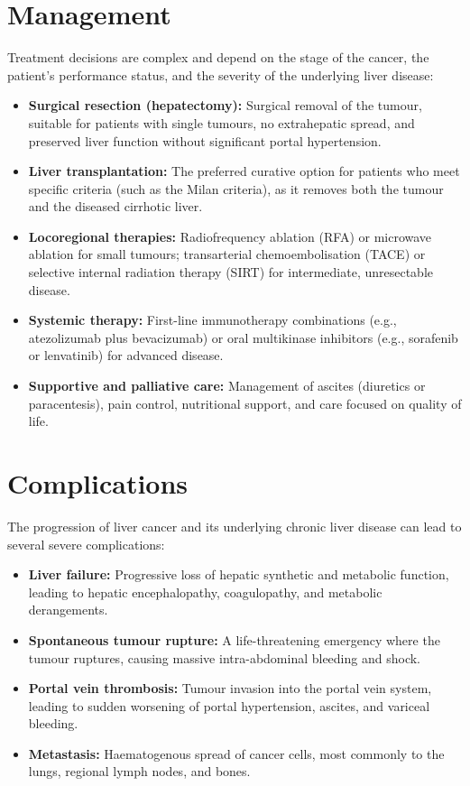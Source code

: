 \section*{Management}
Treatment decisions are complex and depend on the stage of the cancer, the patient's performance status, and the severity of the underlying liver disease:
\begin{itemize}
    \item \textbf{Surgical resection (hepatectomy):} Surgical removal of the tumour, suitable for patients with single tumours, no extrahepatic spread, and preserved liver function without significant portal hypertension.
    \item \textbf{Liver transplantation:} The preferred curative option for patients who meet specific criteria (such as the Milan criteria), as it removes both the tumour and the diseased cirrhotic liver.
    \item \textbf{Locoregional therapies:} Radiofrequency ablation (RFA) or microwave ablation for small tumours; transarterial chemoembolisation (TACE) or selective internal radiation therapy (SIRT) for intermediate, unresectable disease.
    \item \textbf{Systemic therapy:} First-line immunotherapy combinations (e.g., atezolizumab plus bevacizumab) or oral multikinase inhibitors (e.g., sorafenib or lenvatinib) for advanced disease.
    \item \textbf{Supportive and palliative care:} Management of ascites (diuretics or paracentesis), pain control, nutritional support, and care focused on quality of life.
\end{itemize}

\section*{Complications}
The progression of liver cancer and its underlying chronic liver disease can lead to several severe complications:
\begin{itemize}
    \item \textbf{Liver failure:} Progressive loss of hepatic synthetic and metabolic function, leading to hepatic encephalopathy, coagulopathy, and metabolic derangements.
    \item \textbf{Spontaneous tumour rupture:} A life-threatening emergency where the tumour ruptures, causing massive intra-abdominal bleeding and shock.
    \item \textbf{Portal vein thrombosis:} Tumour invasion into the portal vein system, leading to sudden worsening of portal hypertension, ascites, and variceal bleeding.
    \item \textbf{Metastasis:} Haematogenous spread of cancer cells, most commonly to the lungs, regional lymph nodes, and bones.
\end{itemize}

